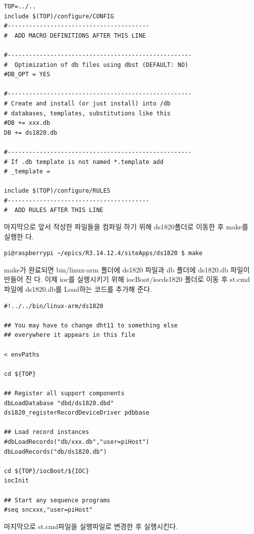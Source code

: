 \documentclass[11pt
  , a4paper
  , article
  , oneside
]{memoir}
\begin{document}
\begin{lstlisting}[style=termstyle]
TOP=../..
include $(TOP)/configure/CONFIG
#----------------------------------------
#  ADD MACRO DEFINITIONS AFTER THIS LINE

#----------------------------------------------------
#  Optimization of db files using dbst (DEFAULT: NO)
#DB_OPT = YES

#----------------------------------------------------
# Create and install (or just install) into /db
# databases, templates, substitutions like this
#DB += xxx.db
DB += ds1820.db

#----------------------------------------------------
# If .db template is not named *.template add
# _template = 

include $(TOP)/configure/RULES
#----------------------------------------
#  ADD RULES AFTER THIS LINE
\end{lstlisting}
마지막으로 앞서 작성한 파일들을 컴파일 하기 위해 ds1820폴더로 이동한 후 make를 실행한
다.
\begin{lstlisting}[style=termstyle]
pi@raspberrypi ~/epics/R3.14.12.4/siteApps/ds1820 $ make
\end{lstlisting}
make가 완료되면 bin/linux-arm 폴더에 ds1820 파일과 db 폴더에 ds1820.db 파일이 만들어 진
다. 이제 ioc를 실행시키기 위해 iocBoot/iocds1820 폴더로 이동 후 st.cmd파일에 ds1820.db를
Load하는 코드를 추가해 준다.
\begin{lstlisting}[style=termstyle]
#!../../bin/linux-arm/ds1820

## You may have to change dht11 to something else
## everywhere it appears in this file

< envPaths

cd ${TOP}

## Register all support components
dbLoadDatabase "dbd/ds1820.dbd"
ds1820_registerRecordDeviceDriver pdbbase

## Load record instances
#dbLoadRecords("db/xxx.db","user=piHost")
dbLoadRecords("db/ds1820.db")

cd ${TOP}/iocBoot/${IOC}
iocInit

## Start any sequence programs
#seq sncxxx,"user=piHost"
\end{lstlisting}
마지막으로 st.cmd파일을 실행파일로 변경한 후 실행시킨다.
\end{document}
